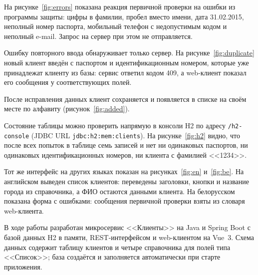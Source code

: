 \documentclass[14pt,a4paper]{extarticle}
\begin{document}
На рисунке~\ref{fig:errors} показана реакция первичной проверки на ошибки из программы
защиты: цифры в фамилии, пробел вместо имени, дата 31.02.2015, неполный номер паспорта,
мобильный телефон с недопустимым кодом и неполный e-mail. Запрос на сервер при этом не
отправляется.


Ошибку повторного ввода обнаруживает только сервер. На рисунке~\ref{fig:duplicate} новый
клиент введён с паспортом и идентификационным номером, которые уже принадлежат клиенту из
базы: сервис ответил кодом 409, а web-клиент показал его сообщения у соответствующих полей.


После исправления данных клиент сохраняется и появляется в списке на своём месте по
алфавиту (рисунок~\ref{fig:added}).


Состояние таблицы можно проверить напрямую в консоли H2 по адресу \texttt{/h2-console}
(JDBC URL \texttt{jdbc:h2:mem:clients}). На рисунке~\ref{fig:h2} видно, что после всех
попыток в таблице семь записей и нет ни одинаковых паспортов, ни одинаковых идентификационных
номеров, ни клиента с фамилией <<1234>>.


Тот же интерфейс на других языках показан на рисунках~\ref{fig:en} и~\ref{fig:be}. На
английском выведен список клиентов: переведены заголовки, кнопки и название города из
справочника, а ФИО остаются данными клиента. На белорусском показана форма с ошибками:
сообщения первичной проверки взяты из словаря web-клиента.




В ходе работы разработан микросервис <<Клиенты>> на Java и Spring Boot с базой данных H2
в памяти, REST-интерфейсом и web-клиентом на Vue~3. Схема данных содержит таблицу клиентов и
четыре справочника для полей типа <<Список>>; база создаётся и заполняется автоматически при
старте приложения.
\end{document}
